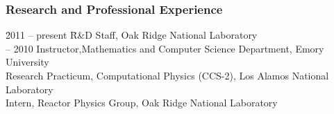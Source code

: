 \subsubsection*{Research and Professional Experience}
\vspace*{-1ex}
\begin{tabbing}
  \hspace*{1ex} 
  \= 2011 -- present \hspace*{2ex} \= R\&D Staff, Oak Ridge National Laboratory\\
   -- 2010 \> Instructor,Mathematics and Computer Science Department,
  Emory University\\
   \> Research Practicum, Computational Physics (CCS-2), Los Alamos
  National Laboratory\\
   \> Intern, Reactor Physics Group, Oak Ridge National Laboratory
\end{tabbing}


\vspace*{-3ex}
